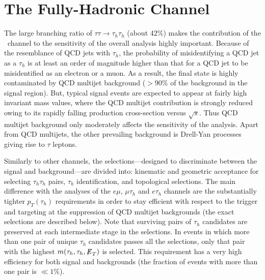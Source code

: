 \section{The Fully-Hadronic Channel}\label{sec:dihad}

The large branching ratio of $\tau\tau \to \tau_{h}\tau_{h}$ (about 42\%) makes the contribution of the \ditauhad ~channel to the sensitivity of the overall analysis highly important. Because of the resemblance of QCD jets with $\tau_{h}$, the probability of misidentifying a QCD jet as a $\tau_{h}$ is at least an order of magnitude higher than that for a QCD jet to be misidentified as an electron or a muon. As a result, the final state is highly contaminated by QCD multijet background ($> 90\%$ of the background in the signal region). But, typical signal events are expected to appear at fairly high invariant mass values, where the QCD multijet contribution is strongly reduced owing to its rapidly falling production cross-section versus $\sqrt{s}$. Thus QCD multijet background only moderately affects the sensitivity of the analysis. Apart from QCD multijets, the other prevailing background is Drell-Yan processes giving rise to $\tau$ leptons. 

Similarly to other channels, the selections---designed to discriminate between the signal and background---are divided into: kinematic and geometric acceptance for selecting $\tau_{h}\tau_{h}$ pairs, $\tau_{h}$ identification, and topological selections. The main difference with the analyses of the $e\mu$, $\mu \tau_h$ and $e \tau_h$ channels are the substantially tighter $p_{T}(\tau_{h})$ requirements in order to stay efficient with respect to the trigger and targeting at the suppression of QCD multijet backgrounds (the exact selections are described below). Note that surviving pairs of $\tau_{h}$ candidates are preserved at each intermediate stage in the selections. In events in which more than one pair of unique $\tau_{h}$ candidates passes all the selections, only that pair with the highest $m(\tau_{h},\tau_{h},{\not\mathrel{E}}_T)$ is selected. This requirement has a very high efficiency for both signal and backgrounds (the fraction of events with more than one pair is $\ll 1$\%).

